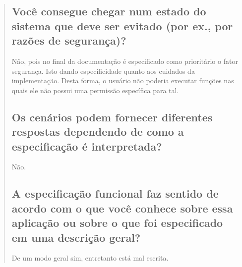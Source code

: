 \documentclass[12pt,a4paper]{report}
\begin{document}
\begin{quotation}
\subsection{Você consegue chegar num estado do sistema que deve ser evitado (por ex., por razões de segurança)?}
Não, pois no final da documentação é especificado como prioritário o fator segurança. Isto dando especificidade quanto aos cuidados da implementação. Desta forma, o usuário não poderia executar funções nas quais ele não possui uma permissão específica para tal.
\subsection{Os cenários podem fornecer diferentes respostas dependendo de como a especificação é interpretada?}
Não.
\subsection{A especificação funcional faz sentido de acordo com o que você conhece sobre essa aplicação ou sobre o que foi especificado em uma descrição geral?}
De um modo geral sim, entretanto está mal escrita.
\end{quotation}
\end{document}
